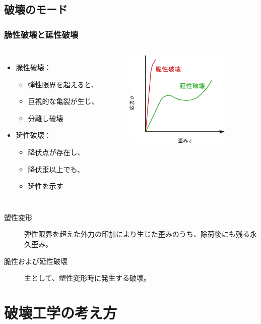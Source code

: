 \documentclass[11pt, dvipdfmx]{beamer}
\begin{document}
\subsection{破壊のモード}
\begin{frame}
\frametitle{脆性破壊と延性破壊}

\begin{columns}[totalwidth=1\textwidth]
	\begin{itemize}
	\item 脆性破壊：
		\begin{itemize}
		\item 
		弾性限界を超えると、
		\item
		巨視的な亀裂が生じ、
		\item
		分離し破壊
		\end{itemize}
	\item 延性破壊：
		\begin{itemize}
		\item 
		降伏点が存在し、
		\item
		降伏歪以上でも、
		\item
		延性を示す
		\end{itemize}
	\end{itemize}
	\begin{figure}
	\centering
	\includegraphics[width=50mm]{S_S_Curve_2.png}
	\end{figure}
\end{columns}

\begin{description}
\item[塑性変形]
弾性限界を超えた外力の印加により生じた歪みのうち、除荷後にも残る永久歪み。
\item[脆性および延性破壊]
主として、塑性変形時に発生する破壊。
\end{description}
\end{frame}

\section{破壊工学の考え方}
\end{document}
